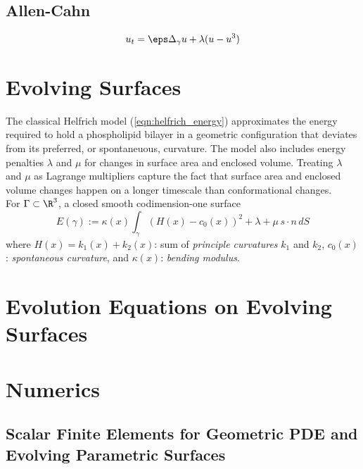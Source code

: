 \documentclass[10pt]{article}
\begin{document}
\subsection{Allen-Cahn}

\begin{equation}
u_t = \eps \Delta_{\gamma} u + \lambda (u - u^3)
   \label{eqn:heat}
\end{equation}




\section{Evolving Surfaces}

The classical Helfrich model (\ref{eqn:helfrich_energy}) approximates the energy
required to hold a phospholipid bilayer in a geometric configuration that
deviates from its preferred, or spontaneuous, curvature. The model also
includes energy penalties $\lambda$ and
$\mu$ for changes in surface area and enclosed volume. Treating $\lambda$ and
$\mu$ as Lagrange multipliers capture the fact that surface area and enclosed
volume changes happen on a longer timescale than conformational changes.\\



For $\Gamma \subset \R^3$, a closed smooth codimension-one surface
\begin{equation}
   E({\gamma}) := \kappa(x) \int_{\gamma} \left( H(x) - c_{0}(x)\right)^2  + \lambda + \mu\, s
\cdot n \, dS 
   \label{eqn:helfrich_energy}
\end{equation}
where $H(x) = k_1(x) + k_2(x)$: sum of \emph{principle curvatures} $k_1$ and
$k_2$, $c_0(x)$: \emph{spontaneous curvature}, and $\kappa(x)$: \emph{bending
modulus}.


\cite{DoganNochetto:2012}


\section{Evolution Equations on Evolving Surfaces}



\section{Numerics}

\subsection{Scalar Finite Elements for Geometric PDE and Evolving Parametric Surfaces}
\end{document}
